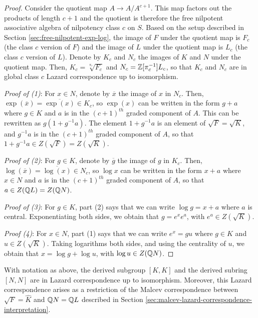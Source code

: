 \begin{proof}
  Consider the quotient map $A \to A/A^{c+1}$. This map factors out
  the products of length $c + 1$ and the quotient is therefore the
  free nilpotent associative algebra of nilpotency class $c$ on
  $S$. Based on the setup described in Section
  \ref{sec:free-nilpotent-exp-log}, the image of $F$ under the
  quotient map is $F_c$ (the class $c$ version of $F$) and the image
  of $L$ under the quotient map is $L_c$ (the class $c$ version of
  $L$). Denote by $K_c$ and $N_c$ the images of $K$ and $N$ under the
  quotient map. Then, $K_c = \sqrt[\pi_c]{F_c}$ and $N_c =
  \mathbb{Z}[\pi_c^{-1}]L_c$, so that $K_c$ and $N_c$ are in global class $c$
  Lazard correspondence up to isomorphism.

  {\em Proof of (1)}: For $x \in N$, denote by $\overline{x}$ the
  image of $x$ in $N_c$. Then, $\exp(\overline{x}) =
  \overline{\exp(x)} \in K_c$, so $\exp(x)$ can be written in the form
  $g + a$ where $g \in K$ and $a$ is in the $(c+1)^{th}$ graded
  component of $A$. This can be rewritten as $g(1 + g^{-1}a)$. The
  element $1 + g^{-1}a$ is an element of $\sqrt{F} = \sqrt{K}$, and
  $g^{-1}a$ is in the $(c+1)^{th}$ graded component of $A$, so that $1
  + g^{-1}a \in Z(\sqrt{F}) = Z(\sqrt{K})$.

  {\em Proof of (2)}: For $g \in K$, denote by $\overline{g}$ the
  image of $g$ in $K_c$. Then, $\log(\overline{x}) =
  \overline{\log(x)} \in N_c$, so $\log x$ can be written in the form
  $x + a$ where $x \in N$ and $a$ is in the $(c+1)^{th}$ graded
  component of $A$, so that $a \in Z(\mathbb{Q} L) = Z(\mathbb{Q} N)$.

  {\em Proof of (3)}: For $g \in K$, part (2) says that we can write
  $\log g = x +a$ where $a$ is central. Exponentiating both sides, we
  obtain that $g = e^xe^a$, with $e^a \in Z(\sqrt{K})$.

 {\em Proof (4)}: For $x \in N$, part (1) says that we can write $e^x
 = gu$ where $g \in K$ and $u \in Z(\sqrt{K})$. Taking logarithms both
 sides, and using the centrality of $u$, we obtain that $x = \log g +
 \log u$, with $\log u \in Z(\mathbb{Q} N)$.
\end{proof} 

\begin{theorem}\label{thm:lazard-correspondence-derived}
  With notation as above, the derived subgroup $[K,K]$ and the derived
  subring $[N,N]$ are in Lazard correspondence up to
  isomorphism. Moreover, this Lazard correspondence arises as a
  restriction of the Malcev correspondence between $\sqrt{F} =
  \hat{K}$ and $\mathbb{Q} N = \mathbb{Q} L$ described in Section
  \ref{sec:malcev-lazard-correspondence-interpretation}.
\end{theorem}

